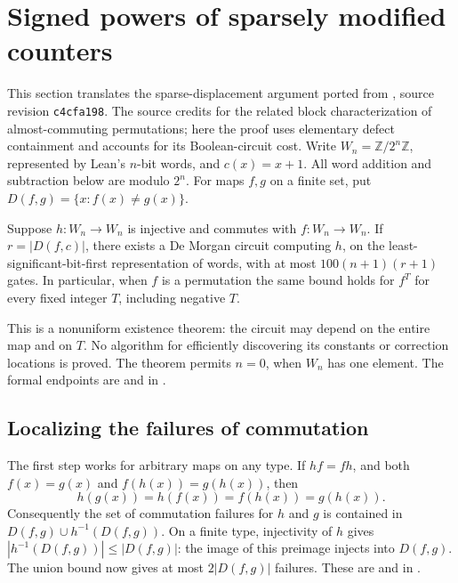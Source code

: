 \section{Signed powers of sparsely modified counters}
\label{sec:sparse-counter}

This section translates the sparse-displacement argument ported from
\citet{Schlesinger2026IteratedFunctions}, source revision \texttt{c4cfa198}. The source credits \citet{MorenoRivera2016}
for the related block characterization of almost-commuting permutations; here
the proof uses elementary defect containment and accounts for its Boolean-circuit cost.
Write $W_n=\mathbb Z/2^n\mathbb Z$, represented by Lean's $n$-bit words, and
$c(x)=x+1$. All word addition and subtraction below are modulo $2^n$.
For maps $f,g$ on a finite set, put $D(f,g)=\{x:f(x)\ne g(x)\}$.

\begin{theorem}
Suppose $h:W_n\to W_n$ is injective and commutes with $f:W_n\to W_n$.
If $r=|D(f,c)|$, there exists a De Morgan circuit computing $h$, on the
least-significant-bit-first representation of words, with at most
$100(n+1)(r+1)$ gates. In particular, when $f$ is a permutation the same
bound holds for $f^T$ for every fixed integer $T$, including negative $T$.
\end{theorem}

This is a nonuniform existence theorem: the circuit may depend on the entire
map and on $T$. No algorithm for efficiently discovering its constants or
correction locations is proved. The theorem permits $n=0$, when $W_n$ has
one element. The formal endpoints are
 and  in
.

\subsection{Localizing the failures of commutation}

The first step works for arbitrary maps on any type. If $hf=fh$, and both
$f(x)=g(x)$ and $f(h(x))=g(h(x))$, then
\[
 h(g(x))=h(f(x))=f(h(x))=g(h(x)).
\]
Consequently the set of commutation failures for $h$ and $g$ is contained in
$D(f,g)\cup h^{-1}(D(f,g))$.
On a finite type, injectivity of $h$ gives
$|h^{-1}(D(f,g))|\le |D(f,g)|$: the image of this preimage injects into
$D(f,g)$. The union bound now gives at most $2|D(f,g)|$ failures.
These are  and
 in
.

